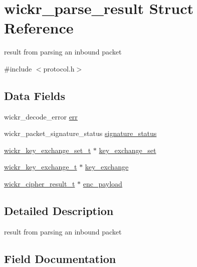 \hypertarget{structwickr__parse__result}{}\section{wickr\+\_\+parse\+\_\+result Struct Reference}
\label{structwickr__parse__result}


result from parsing an inbound packet  




{\ttfamily \#include $<$protocol.\+h$>$}

\subsection*{Data Fields}
\begin{DoxyCompactItemize}
\item 
wickr\+\_\+decode\+\_\+error \mbox{\hyperlink{structwickr__parse__result_a69a3ee332921b4fdbc0e07dbfa74a8ed}{err}}
\item 
wickr\+\_\+packet\+\_\+signature\+\_\+status \mbox{\hyperlink{structwickr__parse__result_a989166b5471898853f03b9e9c58f69c0}{signature\+\_\+status}}
\item 
\mbox{\hyperlink{structwickr__key__exchange__set}{wickr\+\_\+key\+\_\+exchange\+\_\+set\+\_\+t}} $\ast$ \mbox{\hyperlink{structwickr__parse__result_aa35f9328b675b02426fd190ffcd45402}{key\+\_\+exchange\+\_\+set}}
\item 
\mbox{\hyperlink{structwickr__key__exchange}{wickr\+\_\+key\+\_\+exchange\+\_\+t}} $\ast$ \mbox{\hyperlink{structwickr__parse__result_ab33e5d00121c229280bbee814ca7ef5a}{key\+\_\+exchange}}
\item 
\mbox{\hyperlink{structwickr__cipher__result}{wickr\+\_\+cipher\+\_\+result\+\_\+t}} $\ast$ \mbox{\hyperlink{structwickr__parse__result_a584d3b94e032f09188ee4006c067c180}{enc\+\_\+payload}}
\end{DoxyCompactItemize}


\subsection{Detailed Description}
result from parsing an inbound packet 

\subsection{Field Documentation}
\mbox{\label{structwickr__parse__result_a584d3b94e032f09188ee4006c067c180}} 
